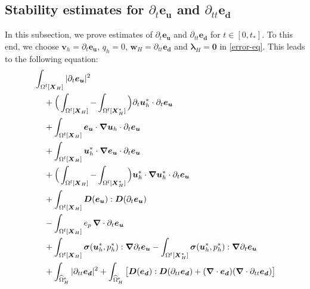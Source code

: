 \documentclass[11pt,reqno]{amsart}
\theoremstyle{definition}
\theoremstyle{plain}
\numberwithin{theorem}{section}
\numberwithin{proposition}{section}
\numberwithin{lemma}{section}
\numberwithin{equation}{section}
\newcommand{\bs}[1]{\boldsymbol{#1}}
\newcommand{\uu}[1]  {{\bs{#1}} }
\newcommand{\dep}{{{\bs{d}}}}
\newcommand{\grad}   { \uu{\nabla}    }
\newcommand{\bu}{\uu{u}}
\renewcommand{\(}{\bigl(}
\renewcommand{\)}{\bigr)}
\begin{document}
\subsection{Stability estimates for \texorpdfstring{$ \partial_t {\bs e}_{\bs u}$}{x} and \texorpdfstring{$\partial_{tt}{\bs e}_{\dep}$}{x}} \label{section:dteu}

In this subsection, we prove estimates of $ \partial_t {\bs e}_{\bs u}$ and $\partial_{tt}{\bs e}_{\dep}$ for $t\in[0,t_*]$. To this end, we choose ${\bs v}_h = \partial_t {\bs e}_{\bs u}$, $q_h=0$, ${\bs w}_H=\partial_{tt}{\bs e}_\dep$ and ${\bs\lambda}_H=\bs 0$ in \eqref{error-eq}. This leads to the following equation:
\begin{subequations}\label{error-eq-dte}
\begin{align} 
& \int_{\Omega^{\rm f}[\bs X_H]} |\partial_t {\bs e}_{\bs u} |^2 
\label{err-a-dte}\\
&\quad\, + \Big( \int_{\Omega^{\rm f}[\bs X_H]} - \int_{\Omega^{\rm f}[\bs X_H^*]} \Big) \partial_t {\bs u}_h^* \cdot \partial_t {\bs e}_{\bs u}\label{err-b-dte}\\
&\quad\, + \int_{\Omega^{\rm f}[\bs X_H]} {\bs e}_{\bs u} \cdot \grad \bu_h \cdot \partial_t {\bs e}_{\bs u} \label{err-c-dte}\\
&\quad\, + \int_{\Omega^{\rm f}[\bs X_H]} {\bs u}_h^* \cdot \grad {\bs e}_{\bs u}  \cdot \partial_t {\bs e}_{\bs u} \label{err-d-dte}\\
&\quad\, + \Big( \int_{\Omega^{\rm f}[\bs X_H]} - \int_{\Omega^{\rm f}[\bs X_H^*]} \Big) {\bs u}_h^* \cdot \grad {\bs u}_h^* \cdot \partial_t {\bs e}_{\bs u} \label{err-e-dte}\\
&\quad\, + \int_{\Omega^{\rm f}[\bs X_H]} \bs D({\bs e}_{\bs u}): \bs D(\partial_t {\bs e}_{\bs u}) \label{err-f-dte}\\ 
&\quad\, - \int_{\Omega^{\rm f}[\bs X_H]}  e_p \,\grad\cdot \partial_t {\bs e}_{\bs u} \label{err-g-dte}\\ 
&\quad\, + \int_{\Omega^{\rm f}[\bs X_H]} {\bs\sigma}(\bu_h^*,p_h^*): \grad \partial_t {\bs e}_{\bs u} 
- \int_{\Omega^{\rm f}[\bs X_H^*]} {\bs\sigma} (\bu_h^*,p_h^*): \grad \partial_t {\bs e}_{\bs u}
\label{err-h-dte}\\ 
&\quad\, +  \int_{\widehat{\Omega}^{\rm s}_H} |\partial_{tt}{\bs e}_{\dep} |^2 
+ \int_{\widehat{\Omega}^{\rm s}_H} \big[ {\bs D}({\bs e}_\dep):{\bs D}(\partial_{tt}{\bs e}_\dep) + (\grad\cdot {\bs e}_\dep ) (\grad\cdot \partial_{tt}{\bs e}_\dep ) \big] \label{err-i-dte}\\ 

\end{align}
\end{subequations}
\end{document}
